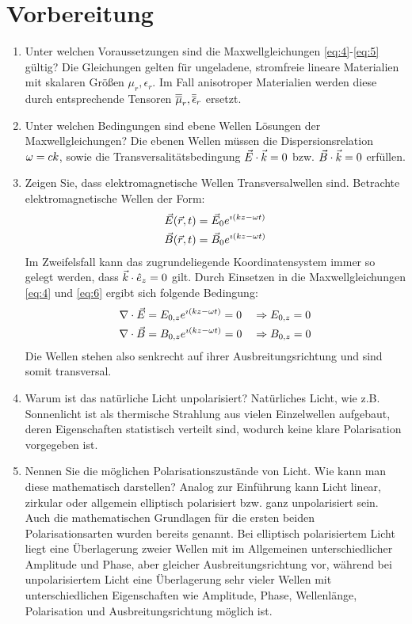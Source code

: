 \section{Vorbereitung}
\begin{enumerate}
	\item Unter welchen Voraussetzungen sind die Maxwellgleichungen \eqref{eq:4}-\eqref{eq:5} gültig?
		\subitem Die Gleichungen gelten für ungeladene, stromfreie lineare Materialien mit skalaren Größen $\mu_r,\epsilon_r$. Im Fall anisotroper Materialien werden diese durch entsprechende Tensoren $\overline{\overline{\mu}}_r,\overline{\overline{\epsilon}}_r$ ersetzt.
	\item Unter welchen Bedingungen sind ebene Wellen Lösungen der Maxwellgleichungen?
		\subitem Die ebenen Wellen müssen die Dispersionsrelation $\omega=c k$, sowie die Transversalitätsbedingung $\vec{E}\cdot\vec{k}=0$ bzw. $\vec{B}\cdot\vec{k}=0$ erfüllen.
	\item Zeigen Sie, dass elektromagnetische Wellen Transversalwellen sind.
		\subitem Betrachte elektromagnetische Wellen der Form:
		\begin{align*}
			\vec{E}(\vec{r},t)&=\vec{E}_0e^{\imath(kz-\omega t)}\\
			\vec{B}(\vec{r},t)&=\vec{B}_0e^{\imath(kz-\omega t)}
		\end{align*}
		Im Zweifelsfall kann das zugrundeliegende Koordinatensystem immer so gelegt werden, dass $\vec{k}\cdot\hat{e}_{z}=0$ gilt. Durch Einsetzen in die Maxwellgleichungen \eqref{eq:4} und \eqref{eq:6} ergibt sich folgende Bedingung:
		\begin{align*}
			\nabla\cdot\vec{E}&=E_{0,z}e^{\imath(kz-\omega t)}=0&&\Rightarrow E_{0,z}=0\\
			\nabla\cdot\vec{B}&=B_{0,z}e^{\imath(kz-\omega t)}=0&&\Rightarrow B_{0,z}=0
		\end{align*}
		Die Wellen stehen also senkrecht auf ihrer Ausbreitungsrichtung und sind somit transversal.
	\item Warum ist das natürliche Licht unpolarisiert?
		\subitem Natürliches Licht, wie z.B. Sonnenlicht ist als thermische Strahlung aus vielen Einzelwellen aufgebaut, deren Eigenschaften statistisch verteilt sind, wodurch keine klare Polarisation vorgegeben ist.
	\item Nennen Sie die möglichen Polarisationszustände von Licht. Wie kann man diese mathematisch darstellen?
		\subitem Analog zur Einführung kann Licht linear, zirkular oder allgemein elliptisch polarisiert bzw. ganz unpolarisiert sein. Auch die mathematischen Grundlagen für die ersten beiden Polarisationsarten wurden bereits genannt. Bei elliptisch polarisiertem Licht liegt eine Überlagerung zweier Wellen mit im Allgemeinen unterschiedlicher Amplitude und Phase, aber gleicher Ausbreitungsrichtung vor, während bei unpolarisiertem Licht eine Überlagerung sehr vieler Wellen mit unterschiedlichen Eigenschaften wie Amplitude, Phase, Wellenlänge, Polarisation und Ausbreitungsrichtung möglich ist. 
		

\end{enumerate}
